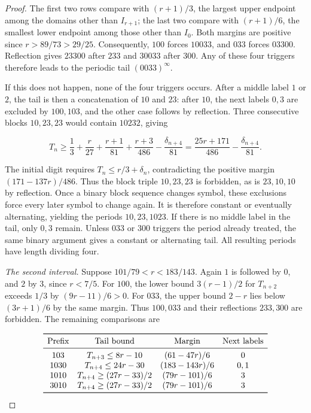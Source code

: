 \documentclass[11pt,a4paper]{amsart}
\numberwithin{equation}{section}
\theoremstyle{definition}
\begin{document}
\begin{proof}
The first two rows compare with \((r+1)/3\), the largest upper
endpoint among the domains other than \(I_{r+1}\); the last two
compare with \((r+1)/6\), the smallest lower endpoint among those
other than \(I_0\). Both margins are positive since
\(r>89/73>29/25\). Consequently, \(100\) forces \(10033\), and
\(033\) forces \(03300\). Reflection gives \(23300\) after \(233\)
and \(30033\) after \(300\). Any of these four triggers therefore
leads to the periodic tail \((0033)^\infty\).

If this does not happen, none of the four triggers occurs. After a
middle label \(1\) or \(2\), the tail is then a concatenation of
\(10\) and \(23\): after \(10\), the next labels \(0,3\) are
excluded by \(100,103\), and the other case follows by reflection.
Three consecutive blocks \(10,23,23\) would contain \(10232\), giving

\[
T_n\ge\frac13+\frac r{27}+\frac{r+1}{81}
 +\frac{r+3}{486}-\frac{\delta_{n+4}}{81}
=\frac{25r+171}{486}-\frac{\delta_{n+4}}{81}.
\]

The initial digit requires \(T_n\le r/3+\delta_n\), contradicting
the positive margin \((171-137r)/486\). Thus the block triple
\(10,23,23\) is forbidden, as is \(23,10,10\) by reflection. Once a binary
block sequence changes symbol, these exclusions force every later
symbol to change again. It is therefore constant or eventually
alternating, yielding the periods \(10,23,1023\).
If there is no middle label in the tail, only \(0,3\) remain.
Unless \(033\) or \(300\) triggers the period already treated,
the same binary argument gives a constant or alternating tail.
All resulting periods have length dividing four.

\emph{The second interval.}
Suppose \(101/79<r<183/143\). Again \(1\) is followed by \(0\),
and \(2\) by \(3\), since \(r<7/5\).
For \(100\), the lower bound \(3(r-1)/2\) for \(T_{n+2}\)
exceeds \(1/3\) by \((9r-11)/6>0\). For \(033\), the upper
bound \(2-r\) lies below \((3r+1)/6\) by the same margin.
Thus \(100,033\) and their reflections \(233,300\) are forbidden.
The remaining comparisons are

\[
\begin{array}{c@{\quad}c@{\quad}c@{\quad}c}
\toprule
\text{Prefix} & \text{Tail bound} & \text{Margin} & \text{Next labels}\\
\midrule
103 & T_{n+3}\le8r-10 & (61-47r)/6 & 0\\
1030 & T_{n+4}\le24r-30 & (183-143r)/6 & 0,1\\
1010 & T_{n+4}\ge(27r-33)/2 & (79r-101)/6 & 3\\
3010 & T_{n+4}\ge(27r-33)/2 & (79r-101)/6 & 3\\
\bottomrule
\end{array}
\]


\end{proof}
\end{document}
